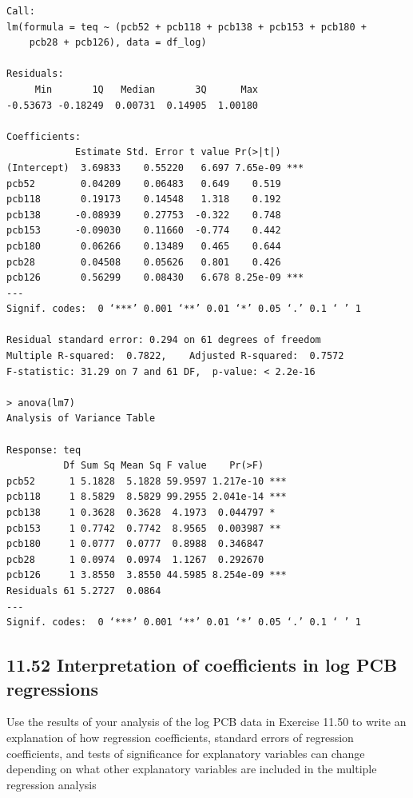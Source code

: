 \documentclass[11pt]{article}
\begin{document}
\begin{verbatim}
Call:
lm(formula = teq ~ (pcb52 + pcb118 + pcb138 + pcb153 + pcb180 + 
    pcb28 + pcb126), data = df_log)

Residuals:
     Min       1Q   Median       3Q      Max 
-0.53673 -0.18249  0.00731  0.14905  1.00180 

Coefficients:
            Estimate Std. Error t value Pr(>|t|)    
(Intercept)  3.69833    0.55220   6.697 7.65e-09 ***
pcb52        0.04209    0.06483   0.649    0.519    
pcb118       0.19173    0.14548   1.318    0.192    
pcb138      -0.08939    0.27753  -0.322    0.748    
pcb153      -0.09030    0.11660  -0.774    0.442    
pcb180       0.06266    0.13489   0.465    0.644    
pcb28        0.04508    0.05626   0.801    0.426    
pcb126       0.56299    0.08430   6.678 8.25e-09 ***
---
Signif. codes:  0 ‘***’ 0.001 ‘**’ 0.01 ‘*’ 0.05 ‘.’ 0.1 ‘ ’ 1

Residual standard error: 0.294 on 61 degrees of freedom
Multiple R-squared:  0.7822,	Adjusted R-squared:  0.7572 
F-statistic: 31.29 on 7 and 61 DF,  p-value: < 2.2e-16

> anova(lm7)
Analysis of Variance Table

Response: teq
          Df Sum Sq Mean Sq F value    Pr(>F)    
pcb52      1 5.1828  5.1828 59.9597 1.217e-10 ***
pcb118     1 8.5829  8.5829 99.2955 2.041e-14 ***
pcb138     1 0.3628  0.3628  4.1973  0.044797 *  
pcb153     1 0.7742  0.7742  8.9565  0.003987 ** 
pcb180     1 0.0777  0.0777  0.8988  0.346847    
pcb28      1 0.0974  0.0974  1.1267  0.292670    
pcb126     1 3.8550  3.8550 44.5985 8.254e-09 ***
Residuals 61 5.2727  0.0864                      
---
Signif. codes:  0 ‘***’ 0.001 ‘**’ 0.01 ‘*’ 0.05 ‘.’ 0.1 ‘ ’ 1
\end{verbatim}



\subsection*{11.52 Interpretation of coefficients in log PCB regressions}
\label{sec:org99acc2a}
Use the results of your analysis of the log PCB data in Exercise 11.50 to write an explanation of how regression coefficients, standard errors of regression coefficients, and tests of significance for explanatory variables can change depending on what other explanatory variables are included in the multiple regression analysis 
\end{document}
